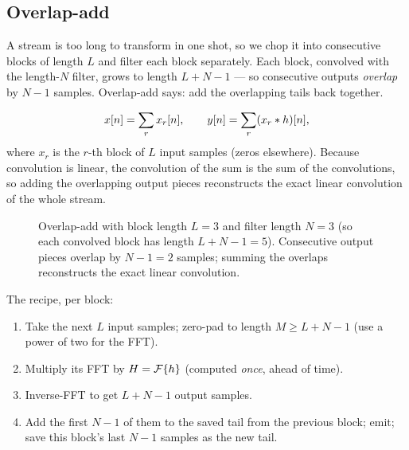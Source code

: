 \subsection{Overlap-add}
\label{ch17:ola}

A stream is too long to transform in one shot, so we chop it into consecutive
blocks of length $L$ and filter each block separately. Each block, convolved
with the length-$N$ filter, grows to length $L+N-1$ --- so consecutive outputs
\emph{overlap} by $N-1$ samples. Overlap-add says: add the overlapping
tails back together.

\begin{equation}
  x[n] = \sum_{r} x_r[n], \qquad
  y[n] = \sum_r (x_r \ast h)[n],
  \label{ch17:olasum}
\end{equation}
where $x_r$ is the $r$-th block of $L$ input samples (zeros elsewhere). Because
convolution is linear, the convolution of the sum is the sum of the
convolutions, so adding the overlapping output pieces reconstructs the exact
linear convolution of the whole stream.

\begin{figure}[H]
\centering
{}
\caption{Overlap-add with block length $L=3$ and filter length $N=3$ (so each
convolved block has length $L+N-1=5$). Consecutive output pieces overlap by
$N-1=2$ samples; summing the overlaps reconstructs the exact linear
convolution.}
\label{ch17:fig-ola}
\end{figure}

The recipe, per block:
\begin{enumerate}
  \item Take the next $L$ input samples; zero-pad to length $M \ge L+N-1$ (use a
        power of two for the FFT).
  \item Multiply its FFT by $H = \mathcal{F}\{h\}$ (computed \emph{once}, ahead of time).
  \item Inverse-FFT to get $L+N-1$ output samples.
  \item Add the first $N-1$ of them to the saved tail from the previous block;
        emit; save this block's last $N-1$ samples as the new tail.
\end{enumerate}

